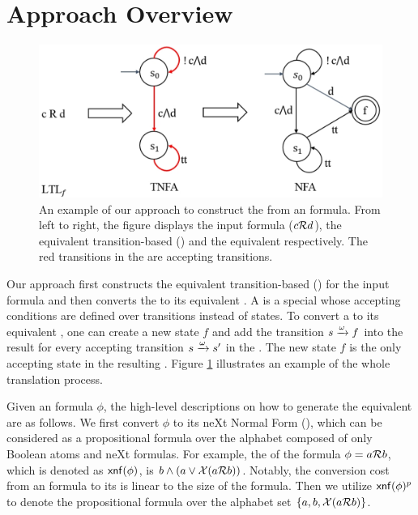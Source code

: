 \section{Approach Overview} \label{sec:overview}

\begin{figure}
\centering
  \includegraphics[scale=0.4]{overview.pdf}
  \caption{An example of our approach to construct the \NFA from an \ltlf formula. From left to right, the figure displays the input formula ($c\mathcal{R} d$), the equivalent transition-based \NFA (\TNFA) and the equivalent \NFA respectively. The red transitions in the \TNFA are accepting transitions.}
  \label{fig:overview}
\end{figure}

Our approach first constructs the equivalent transition-based \NFA (\TNFA) for the input formula and then converts the \TNFA to its equivalent \NFA. A \TNFA is a special \NFA whose accepting conditions are defined over transitions instead of states. To convert a \TNFA to its equivalent \NFA, one can create a new state $f$ and add the transition $s\xrightarrow[]{\omega}f$ into the result \NFA for every accepting transition $s\xrightarrow[]{\omega}s'$ in the \TNFA. The new state $f$ is the only accepting state in the resulting \NFA. Figure \ref{fig:overview} illustrates an example of the whole translation process. 

Given an \ltlf formula $\phi$, the high-level descriptions on how to generate the equivalent \TNFA are as follows. We first convert $\phi$ to its neXt Normal Form (\XNF), which can be considered as a propositional formula over the alphabet composed of only Boolean atoms and neXt formulas. For example, the \XNF of the formula $\phi=a\mathcal{R} b$, which is denoted as ${\sf xnf}(\phi)$, is $b\wedge (a\vee \mathcal{X}(a\mathcal{R} b))$. Notably, the conversion cost from an \ltlf formula to its \XNF is linear to the size of the formula. Then we utilize ${\sf xnf}(\phi)^p$ to denote the propositional formula over the alphabet set $\{a, b, \mathcal{X}(a\mathcal{R} b)\}$.

